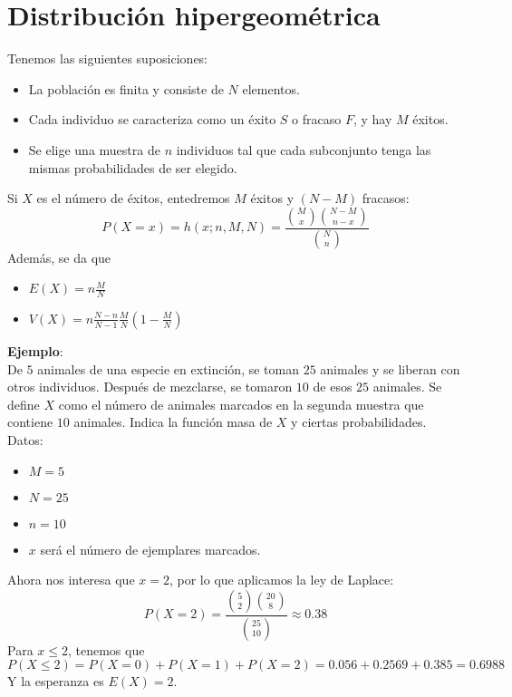 \documentclass{./Probabilidad.tex}
\begin{document}
\section{Distribución hipergeométrica}
Tenemos las siguientes suposiciones:
\begin{itemize}
	\item La población es finita y consiste de $N$ elementos.
	\item Cada individuo se caracteriza como un éxito $S$ o fracaso $F$, y hay $M$ éxitos.
	\item Se elige una muestra de $n$ individuos tal que cada subconjunto tenga las mismas probabilidades de ser elegido. 
\end{itemize}
Si $X$ es el número de éxitos, entedremos $M$ éxitos y $(N-M)$ fracasos:
\[
	P(X=x)=h(x;n,M,N) = \frac{\binom{M}{x}\binom{N-M}{n-x}}{\binom{N}{n}}
\]
Además, se da que
\begin{itemize}
	\item $E(X)=n \frac{M}{N}$
	\item $V(X)=n \frac{N-n}{N-1} \frac{M}{N} (1 - \frac{M}{N})$ 
\end{itemize}
\textbf{Ejemplo}:\\
De $5$ animales de una especie en extinción, se toman $25$ animales y se liberan con otros individuos. Después de mezclarse, se tomaron $10$ de esos $25$ animales. Se define $X$ como el número de animales marcados en la segunda muestra que contiene $10$ animales. Indica la función masa de $X$ y ciertas probabilidades.\\
Datos:
\begin{itemize}
	\item $M=5$
	\item $N=25$
	\item $n=10$
	\item $x$ será el número de ejemplares marcados. 
\end{itemize}
Ahora nos interesa que $x=2$, por lo que aplicamos la ley de Laplace:
\[
	P(X=2)= \frac{\binom{5}{2}\binom{20}{8}}{\binom{25}{10}}\approx 0.38
\]
Para $x\leq 2$, tenemos que
\[
	P(X\leq 2) = P(X=0) + P(X=1)+P(X=2)=0.056+0.2569+0.385=0.6988
\]
Y la esperanza es $E(X)=2$.
\end{document}
